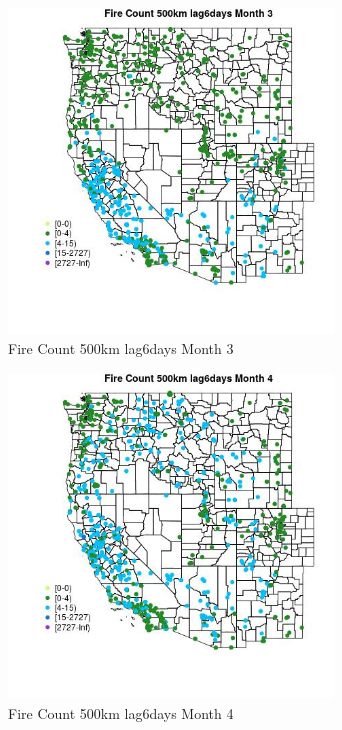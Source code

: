 \begin{figure} 
\centering  
\includegraphics[width=0.77\textwidth]{Code_Outputs/Report_ML_input_PM25_Step4_part_f_de_duplicated_aves_prioritize_24hr_obswNAs_MapObsMo3Fire_Count_500km_lag6days.jpg} 
\caption{\label{fig:Report_ML_input_PM25_Step4_part_f_de_duplicated_aves_prioritize_24hr_obswNAsMapObsMo3Fire_Count_500km_lag6days}Fire Count 500km lag6days Month 3} 
\end{figure} 
 

\clearpage 

\begin{figure} 
\centering  
\includegraphics[width=0.77\textwidth]{Code_Outputs/Report_ML_input_PM25_Step4_part_f_de_duplicated_aves_prioritize_24hr_obswNAs_MapObsMo4Fire_Count_500km_lag6days.jpg} 
\caption{\label{fig:Report_ML_input_PM25_Step4_part_f_de_duplicated_aves_prioritize_24hr_obswNAsMapObsMo4Fire_Count_500km_lag6days}Fire Count 500km lag6days Month 4} 
\end{figure} 
 

